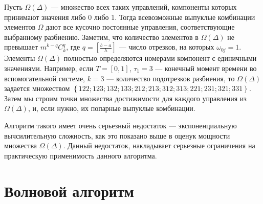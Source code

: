 Пусть $\Omega(\Delta)$ --- множество всех таких управлений, компоненты
которых принимают значения либо 0 либо 1. Тогда всевозможные выпуклые
комбинации элементов $\Omega$ дают все кусочно постоянные управления,
соответствующие выбранному разбиению.  Заметим, что количество
элементов в $\Omega(\Delta)$ не превышает $m^{k-q} C_k^q$, где
$q=\left[\frac{b-a}{h}\right]$ --- число отрезков, на которых
$\omega_{0j}=1$.  Элементы $\Omega(\Delta)$ полностью определяются
номерами компонент с единичными значениями. Например, если $T=[0,1]$,
$\tau_1=3$ --- конечный момент времени во вспомогательной системе,
$k=3$ --- количество подотрезков разбиения, то $\Omega(\Delta)$
задается множеством
$\left\{122; 123 ; 132 ; 133 ;212 ; 213; 312 ; 313 ; 221; 231 ; 321 ;
  331 \right\}$.
Затем мы строим точки множества достижимости для каждого управления из
$\Omega(\Delta)$, и, если нужно, их попарные выпуклые комбинации.

Алгоритм такого имеет очень серьезный недостаток --- экспоненциальную
вычсилительную сложность, как это показано выше в оценук мощности
множества $\Omega(\Delta)$. Данный недостаток, накладывает серьезные
ограничения на практическую применимость данного алгоритма.

\section{Волновой алгоритм}
\label{sec:wave_alg}
